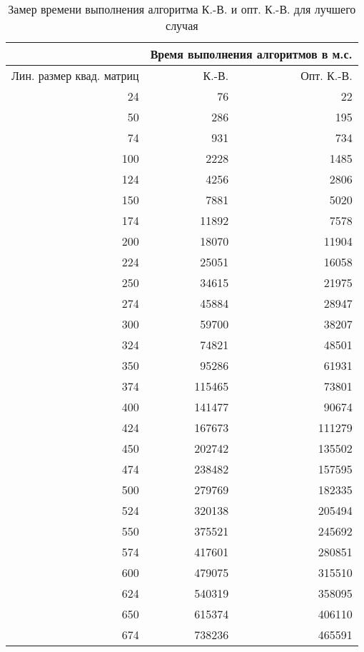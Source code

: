 \begin{table}[h]
	\begin{center}
		\begin{threeparttable}
		\captionsetup{justification=raggedright, singlelinecheck=off}
		\caption{\centering\label{tbl:best_time}Замер времени выполнения алгоритма К.-В. и опт. К.-В. для лучшего случая}
		\begin{tabular}{|r|r|r|}
		\hline
		& \multicolumn{2}{r|}{Время выполнения алгоритмов в м.с.} \\
		\hline
		Лин. размер квад. матриц & К.-В. & Опт. К.-В. \\
		\hline
		24 & 76 & 22 \\
		\hline
		50 & 286 & 195 \\
		\hline
		74 & 931 & 734 \\
		\hline
		100 & 2228 & 1485 \\
		\hline
		124 & 4256 & 2806 \\
		\hline
		150 & 7881 & 5020 \\
		\hline
		174 & 11892 & 7578 \\
		\hline
		200 & 18070 & 11904 \\
		\hline
		224 & 25051 & 16058 \\
		\hline
		250 & 34615 & 21975 \\
		\hline
		274 & 45884 & 28947 \\
		\hline
		300 & 59700 & 38207 \\
		\hline
		324 & 74821 & 48501 \\
		\hline
		350 & 95286 & 61931 \\
		\hline
		374 & 115465 & 73801 \\
		\hline
		400 & 141477 & 90674 \\
		\hline
		424 & 167673 & 111279 \\
		\hline
		450 & 202742 & 135502 \\
		\hline
		474 & 238482 & 157595 \\
		\hline
		500 & 279769 & 182335 \\
		\hline
		524 & 320138 & 205494 \\
		\hline
		550 & 375521 & 245692 \\
		\hline
		574 & 417601 & 280851 \\
		\hline
		600 & 479075 & 315510 \\
		\hline
		624 & 540319 & 358095 \\
		\hline
		650 & 615374 & 406110 \\
		\hline
		674 & 738236 & 465591 \\

\end{tabular}
\end{threeparttable}
\end{center}
\end{table}
